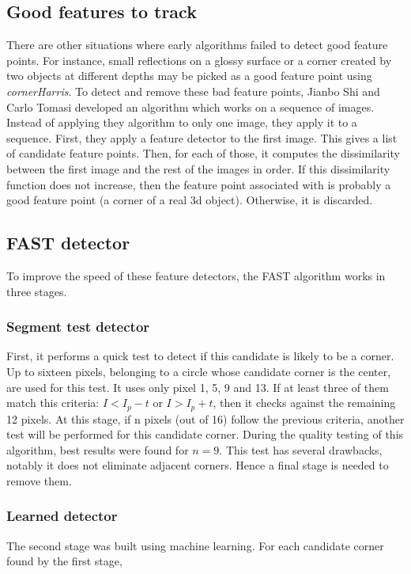 \documentclass[11pt]{report}
\begin{document}
\subsection{Good features to track}
There are other situations where early algorithms failed to detect good feature points. For instance, small reflections on a glossy surface or a corner created by two objects at different depths may be picked as a good feature point using \textit{cornerHarris}. To detect and remove these bad feature points, Jianbo Shi and Carlo Tomasi developed an algorithm\cite{Shi94} which works on a sequence of images. Instead of applying they algorithm to only one image, they apply it to a sequence. First, they apply a feature detector to the first image. This gives a list of candidate feature points. Then, for each of those, it computes the dissimilarity between the first image and the rest of the images in order. If this dissimilarity function does not increase, then the feature point associated with is probably a good feature point (a corner of a real 3d object). Otherwise, it is discarded.

\subsection{FAST detector}

To improve the speed of these feature detectors, the FAST\cite{Fast06} algorithm works in three stages. 

\subsubsection{Segment test detector}
First, it performs a quick test to detect if this candidate is likely to be a corner. Up to sixteen pixels, belonging to a circle whose candidate corner is the center, are used for this test. It uses only pixel 1, 5, 9 and 13. If at least three of them match this criteria: $I < I_p - t$ or $I > I_p + t$, then it checks against the remaining 12 pixels. At this stage, if n pixels (out of 16) follow the previous criteria, another test will be performed for this candidate corner. During the quality testing of this algorithm, best results were found for $n = 9$. This test has several drawbacks, notably it does not eliminate adjacent corners. Hence a final stage is needed to remove them.

\subsubsection{Learned detector}
The second stage was built using machine learning. For each candidate corner found by the first stage, 
\end{document}
